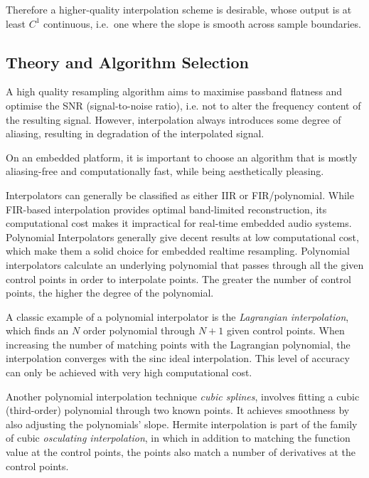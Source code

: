 Therefore a higher-quality interpolation scheme is desirable, whose output is at least $C^1$ 
continuous, i.e.\ one where the slope is smooth across sample boundaries.

\subsection{Theory and Algorithm Selection}

A high quality resampling algorithm aims to maximise passband flatness and optimise the SNR (signal-to-noise ratio), i.e. not to alter the frequency content of the resulting signal.
However, interpolation always introduces some degree of aliasing, resulting in degradation of the interpolated signal.

On an embedded platform, it is important to choose an algorithm that is mostly aliasing-free and computationally fast, while being aesthetically pleasing.

Interpolators can generally be classified as either IIR or FIR/polynomial. \cite[p.~11]{juliuso.smithInterpolatedDelayLines2022} 
While FIR-based interpolation provides optimal band-limited reconstruction, its computational cost makes it impractical for real-time embedded audio systems. %
Polynomial Interpolators generally give decent results at low computational cost, which make them a solid choice for embedded realtime resampling.
Polynomial interpolators calculate an underlying polynomial that passes through all the given control points in order to interpolate points.
The greater the number of control points, the higher the degree of the polynomial. 

A classic example of a polynomial interpolator is the \textit{Lagrangian interpolation}, which finds an $N$ order polynomial through $N+1$ given control points. \cite{smithjuliuso.DigitalAudioResampling}
When increasing the number of matching points with the Lagrangian polynomial, the interpolation converges with the sinc ideal interpolation. 
This level of accuracy can only be achieved with very high computational cost.

Another polynomial interpolation technique \textit{cubic splines}, involves fitting a cubic (third-order) polynomial through two known points. It achieves smoothness by also adjusting the polynomials' slope. \cite{smithjuliuso.DigitalAudioResampling}
Hermite interpolation is part of the family of cubic \textit{osculating interpolation}, in which in addition to matching the function value at the control points, the points also match a number of derivatives at the control points. \cite{olliniemitaloPolynomialInterpolatorsHighQuality2001}

